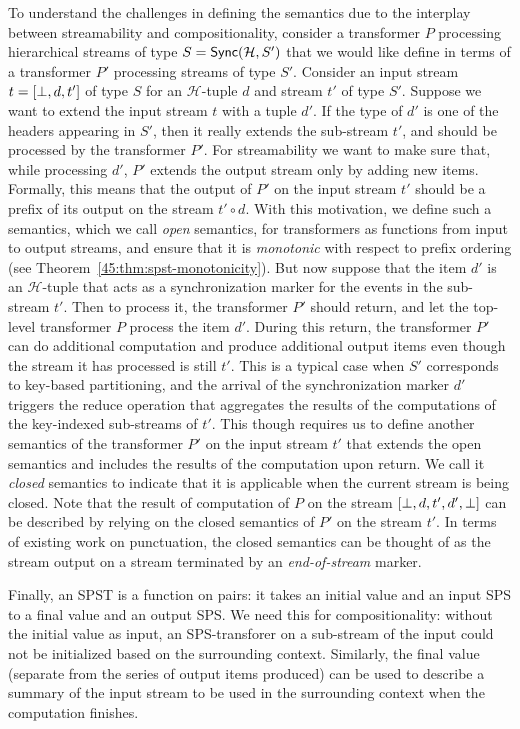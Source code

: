 To understand  the challenges in defining the semantics due to the interplay between streamability and compositionality, consider a transformer $P$ processing
hierarchical streams of type  $S=\mathsf{Sync}({\mathcal{H}}, S')$ that we would like
define in terms of a transformer $P'$ processing streams of type $S'$.
Consider an input stream $t=[\bot, d, t']$ of type $S$ for an $\mathcal{H}$-tuple $d$ and
stream $t'$ of type $S'$. Suppose we want to extend the input stream $t$ with
a tuple $d'$. If the type of $d'$ is one of the headers appearing in $S'$, then
it really extends the sub-stream $t'$, and should be processed by the transformer $P'$.
For streamability we want to make sure that, while processing $d'$, $P'$ extends the output stream only
by adding new items. Formally, this means that the output of $P'$ on the input
stream $t'$ should be a prefix of its output on the stream $t'\circ d$.
With this motivation, we define such a semantics, which we call \emph{open} semantics,
for transformers as functions from input to output streams, and ensure that it is \emph{monotonic}
 with respect to prefix ordering
(see Theorem~\ref{45:thm:spst-monotonicity}).
But now suppose that the item $d'$ is an ${\mathcal H}$-tuple
that acts as a synchronization marker for the events in the sub-stream $t'$.
Then to process it, the transformer $P'$ should return, and let the top-level
transformer $P$ process the item $d'$.
During this return, the transformer $P'$ can do additional computation and produce
additional output items even though the stream it has processed is still $t'$.
This is a typical case when $S'$ corresponds to key-based partitioning,
and the arrival of the synchronization marker $d'$ triggers the reduce operation
that aggregates the results of the computations of the key-indexed sub-streams of $t'$.
This though requires us to define another semantics of the transformer $P'$ on
the input stream $t'$ that extends the open semantics and includes the results
of the computation upon return. We call it \emph{closed} semantics to indicate
that it is applicable when the current stream  is being closed.
Note that the result of computation of $P$ on the stream $[\bot, d,t',d', \bot]$ can be
described by relying on the closed semantics of $P'$ on the stream $t'$.
In terms of existing work on punctuation,
the closed semantics can be thought of as the stream output on
a stream terminated by an \emph{end-of-stream} marker.

Finally, an SPST is a function on pairs:
it takes an initial value and an input
SPS to a final value and an output SPS.
We need this for compositionality: without the initial value as input, an SPS-transforer
on a sub-stream of the input could not be initialized based on the surrounding context.
Similarly, the final value (separate from the series of output items produced) can be
used to describe a summary of the input stream to be used in the surrounding context
when the computation finishes.

